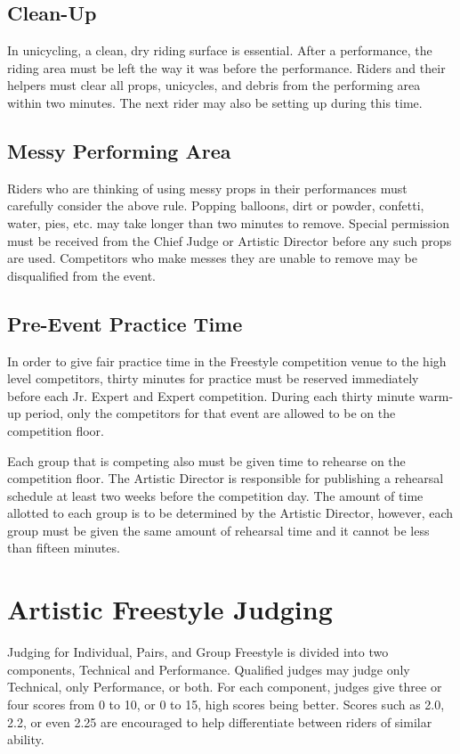 \section{Clean-Up}
In unicycling, a clean, dry riding surface is essential.
After a performance, the riding area must be left the way it was before the performance.
Riders and their helpers must clear all props, unicycles, and debris from the performing area within two minutes.
The next rider may also be setting up during this time.

\section{Messy Performing Area}
Riders who are thinking of using messy props in their performances must carefully consider the above rule.
Popping balloons, dirt or powder, confetti, water, pies, etc.
may take longer than two minutes to remove.
Special permission must be received from the Chief Judge or Artistic Director before any such props are used.
Competitors who make messes they are unable to remove may be disqualified from the event.

\section{Pre-Event Practice Time}
In order to give fair practice time in the Freestyle competition venue to the high level competitors, thirty minutes for practice must be reserved immediately before each Jr. Expert and Expert competition.
During each thirty minute warm-up period, only the competitors for that event are allowed to be on the competition floor.

Each group that is competing also must be given time to rehearse on the competition floor.
The Artistic Director is responsible for publishing a rehearsal schedule at least two weeks before the competition day.
The amount of time allotted to each group is to be determined by the Artistic Director, however, each group must be given the same amount of rehearsal time and it cannot be less than fifteen minutes.

\chapter{Artistic Freestyle Judging}

Judging for Individual, Pairs, and Group Freestyle is divided into two components, Technical and Performance.
Qualified judges may judge only Technical, only Performance, or both.
For each component, judges give three or four scores from 0 to 10, or 0 to 15, high scores being better.
Scores such as 2.0, 2.2, or even 2.25 are encouraged to help differentiate between riders of similar ability.

